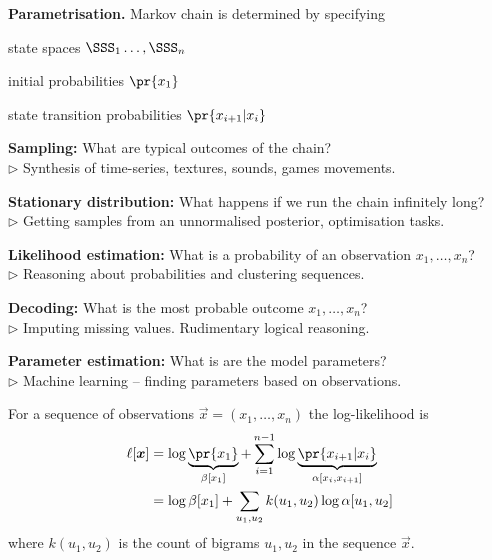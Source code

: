 \documentclass[landscape,footrule]{foils}
\begin{document}
\textbf{Parametrisation.}
Markov chain is determined by specifying 

\begin{triangles}
\item state spaces $\SSS_1\ldots,\SSS_n$
\item initial probabilities $\pr{x_1}$
\item state transition probabilities $\pr{x_{i+1}|x_{i}}$
\end{triangles}


\textbf{Sampling:} What are typical outcomes of the chain?\\
$\triangleright$ Synthesis of time-series, textures, sounds, games movements. 
\vspace*{1.5ex} 

\textbf{Stationary distribution:} What happens if we run the chain infinitely long?\\
$\triangleright$ Getting samples from an unnormalised posterior, optimisation tasks. 
\vspace*{1.5ex}  

\textbf{Likelihood estimation:} What is a probability of an observation $x_1,\ldots,x_n$?\\
$\triangleright$ Reasoning about probabilities and clustering sequences.
\vspace*{1.5ex} 

\textbf{Decoding:} What is the most probable outcome $x_1,\ldots,x_n$?\\ 
$\triangleright$ Imputing missing values. Rudimentary logical reasoning. 
\vspace*{1.5ex} 

\textbf{Parameter estimation:} What is are the model parameters?\\
$\triangleright$ Machine learning -- finding parameters based on observations.



For a sequence of observations $\vec{x}=(x_1,\ldots, x_{n})$ the log-likelihood is
\begin{align*}
\ell[\vec{x}]&=\log \underbrace{\pr{x_1}}_{\beta[x_1]} + \sum_{i=1}^{n-1} \log \underbrace{\pr{x_{i+1}|x_{i}}}_{\alpha[x_i, x_{i+1}]} \\
&=\log \beta[x_1] + \sum_{u_1,u_2} k(u_1,u_2)\log\alpha[u_1,u_2]
\end{align*}
where $k(u_1,u_2)$ is the count of bigrams $u_1, u_2$ in the sequence $\vec{x}$.
\end{document}
